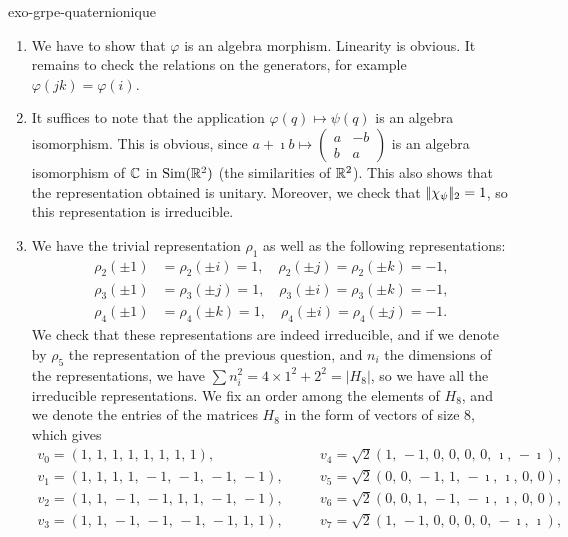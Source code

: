  
\begin{correction}{exo-grpe-quaternionique}
   \begin{enumerate}
\item We have to show that $ \varphi $ is an algebra morphism. Linearity is obvious. It remains to check the relations on the generators, for example $ \varphi (jk) = \varphi (i) $.
\item {} It suffices to note that the application $ \varphi (q) \mapsto \psi (q) $ is an algebra isomorphism. This is obvious, since $ a + \imath b \mapsto \left(\begin{smallmatrix} a & -b \\b & a \end{smallmatrix} \right) $ is an algebra isomorphism of $ \mathbb{C} $ in $ \text{Sim} (\mathbb{R}^2) $ (the similarities of $ \mathbb{R}^2 $). This also shows that the representation obtained is unitary. Moreover, we check that $ |\!| \chi_\psi |\!|_2 = 1 $, so this representation is irreducible.
\item We have the trivial representation $ \rho_1 $ as well as the following representations:
\begin{align*}
\rho_2 (\pm 1) & = \rho_2 (\pm i) = 1, \quad \rho_2 (\pm j) = \rho_2 (\pm k) = -1, \\
\rho_3 (\pm 1) & = \rho_3 (\pm j) = 1, \quad \rho_3 (\pm i) = \rho_3 (\pm k) = -1, \\
\rho_4 (\pm 1) & = \rho_4 (\pm k) = 1, \quad \rho_4 (\pm i) = \rho_4 (\pm j) = -1.
\end{align*}
We check that these representations are indeed irreducible, and if we denote by $ \rho_5 $ the representation of the previous question, and $ n_i $ the dimensions of the representations, we have $ \sum{n_i^2} = 4 \times 1^2 + 2^2 = | H_8 | $, so we have all the irreducible representations. We fix an order among the elements of $ H_8 $, and we denote the entries of the matrices $ H_8 $ in the form of vectors of size $ 8 $, which gives
\begin{equation*}
\begin{array}{ccc} v_0 = (1, \, 1, \, 1, \, 1, \, 1, \, 1, \, 1, \, 1), & \quad & v_4 = \sqrt{2} (1, \,-1, \, 0, \, 0, \, 0, \, 0, \, \imath, \, - \imath), \\v_1 = (1, \, 1, \, 1, \, 1, \,-1, \,-1, \,-1, \,-1), & \quad & v_5 = \sqrt{2} (0, \, 0, \,-1, \, 1, \, - \imath, \, \imath, \, 0, \, 0), \\v_2 = (1, \, 1, \,-1, \,-1, \, 1 , \, 1, \,-1, \,-1), & \quad & v_6 = \sqrt{2} (0, \, 0, \, 1, \,-1, \, - \imath, \, \imath, \, 0, \, 0), \\v_3 = (1, \, 1, \,-1, \,-1, \,-1, \,-1, \, 1, \, 1), & \quad & v_7 = \sqrt{2} (1, \,-1, \, 0, \, 0, \, 0, \, 0, \, - \imath, \, \imath), \end{array}

\end{equation*}
\end{enumerate}
\end{correction}
